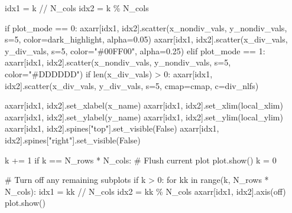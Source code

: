 \documentclass[
  letterpaper,
  DIV=11,
  numbers=noendperiod]{scrartcl}
\newenvironment{Shaded}{\begin{snugshade}}{\end{snugshade}}
\newcommand{\BuiltInTok}[1]{\textcolor[rgb]{0.00,0.23,0.31}{#1}}
\newcommand{\CommentTok}[1]{\textcolor[rgb]{0.37,0.37,0.37}{#1}}
\newcommand{\ControlFlowTok}[1]{\textcolor[rgb]{0.00,0.23,0.31}{#1}}
\newcommand{\DecValTok}[1]{\textcolor[rgb]{0.68,0.00,0.00}{#1}}
\newcommand{\FloatTok}[1]{\textcolor[rgb]{0.68,0.00,0.00}{#1}}
\newcommand{\KeywordTok}[1]{\textcolor[rgb]{0.00,0.23,0.31}{#1}}
\newcommand{\NormalTok}[1]{\textcolor[rgb]{0.00,0.23,0.31}{#1}}
\newcommand{\OperatorTok}[1]{\textcolor[rgb]{0.37,0.37,0.37}{#1}}
\newcommand{\StringTok}[1]{\textcolor[rgb]{0.13,0.47,0.30}{#1}}
\newcommand{\VariableTok}[1]{\textcolor[rgb]{0.07,0.07,0.07}{#1}}
\begin{document}
\begin{Shaded}
\begin{Highlighting}[]
\NormalTok{    idx1 }\OperatorTok{=}\NormalTok{ k }\OperatorTok{//}\NormalTok{ N\_cols}
\NormalTok{    idx2 }\OperatorTok{=}\NormalTok{ k }\OperatorTok{\%}\NormalTok{ N\_cols}
    
    \ControlFlowTok{if}\NormalTok{ plot\_mode }\OperatorTok{==} \DecValTok{0}\NormalTok{:}
\NormalTok{      axarr[idx1, idx2].scatter(x\_nondiv\_vals, y\_nondiv\_vals, s}\OperatorTok{=}\DecValTok{5}\NormalTok{,}
\NormalTok{                                color}\OperatorTok{=}\NormalTok{dark\_highlight, alpha}\OperatorTok{=}\FloatTok{0.05}\NormalTok{)}
\NormalTok{      axarr[idx1, idx2].scatter(x\_div\_vals, y\_div\_vals, s}\OperatorTok{=}\DecValTok{5}\NormalTok{,}
\NormalTok{                                color}\OperatorTok{=}\StringTok{"\#00FF00"}\NormalTok{, alpha}\OperatorTok{=}\FloatTok{0.25}\NormalTok{)}
    \ControlFlowTok{elif}\NormalTok{ plot\_mode }\OperatorTok{==} \DecValTok{1}\NormalTok{:}
\NormalTok{      axarr[idx1, idx2].scatter(x\_nondiv\_vals, y\_nondiv\_vals,}
\NormalTok{                                s}\OperatorTok{=}\DecValTok{5}\NormalTok{, color}\OperatorTok{=}\StringTok{"\#DDDDDD"}\NormalTok{)}
      \ControlFlowTok{if} \BuiltInTok{len}\NormalTok{(x\_div\_vals) }\OperatorTok{\textgreater{}} \DecValTok{0}\NormalTok{:}
\NormalTok{        axarr[idx1, idx2].scatter(x\_div\_vals, y\_div\_vals, s}\OperatorTok{=}\DecValTok{5}\NormalTok{,}
\NormalTok{                                  cmap}\OperatorTok{=}\NormalTok{cmap, c}\OperatorTok{=}\NormalTok{div\_nlfs)}
                                
\NormalTok{    axarr[idx1, idx2].set\_xlabel(x\_name)}
\NormalTok{    axarr[idx1, idx2].set\_xlim(local\_xlim)}
\NormalTok{    axarr[idx1, idx2].set\_ylabel(y\_name)}
\NormalTok{    axarr[idx1, idx2].set\_ylim(local\_ylim)}
\NormalTok{    axarr[idx1, idx2].spines[}\StringTok{"top"}\NormalTok{].set\_visible(}\VariableTok{False}\NormalTok{)}
\NormalTok{    axarr[idx1, idx2].spines[}\StringTok{"right"}\NormalTok{].set\_visible(}\VariableTok{False}\NormalTok{)}
    
\NormalTok{    k }\OperatorTok{+=} \DecValTok{1}
    \ControlFlowTok{if}\NormalTok{ k }\OperatorTok{==}\NormalTok{ N\_rows }\OperatorTok{*}\NormalTok{ N\_cols:}
      \CommentTok{\# Flush current plot}
\NormalTok{      plot.show()}
\NormalTok{      k }\OperatorTok{=} \DecValTok{0}
  
  \CommentTok{\# Turn off any remaining subplots}
  \ControlFlowTok{if}\NormalTok{ k }\OperatorTok{\textgreater{}} \DecValTok{0}\NormalTok{: }
    \ControlFlowTok{for}\NormalTok{ kk }\KeywordTok{in} \BuiltInTok{range}\NormalTok{(k, N\_rows }\OperatorTok{*}\NormalTok{ N\_cols):}
\NormalTok{      idx1 }\OperatorTok{=}\NormalTok{ kk }\OperatorTok{//}\NormalTok{ N\_cols}
\NormalTok{      idx2 }\OperatorTok{=}\NormalTok{ kk }\OperatorTok{\%}\NormalTok{ N\_cols}
\NormalTok{      axarr[idx1, idx2].axis(}\StringTok{\textquotesingle{}off\textquotesingle{}}\NormalTok{)}
\NormalTok{    plot.show()}
\end{Highlighting}
\end{Shaded}
\end{document}
